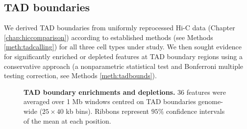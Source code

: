 \documentclass[a4paper,11pt,oneside]{book}
\begin{document}
\subsection{TAD boundaries}

We derived TAD boundaries from uniformly reprocessed Hi-C data (Chapter \ref{chap:hiccomparison}) according to established methods (see Methods \ref{meth:tadcalling}) for all three cell types under study. We then sought evidence for significantly enriched or depleted features at TAD boundary regions using a conservative approach (a nonparametric statistical test and Bonferroni multiple testing correction, see Methods \ref{meth:tadbounds}).

\begin{figure}
\begin{center} 
\captionsetup{width=\textwidth}
\caption[TAD boundary enrichments and depletions.]{ {\bf TAD boundary enrichments and depletions.}
36 features were averaged over 1 Mb windows centred on TAD boundaries genome-wide ($25 \times 40$ kb bins). Ribbons represent $95\%$ confidence intervals of the mean at each position.
}\label{fig:alltads}
\end{center}
\end{figure} 
\end{document}
